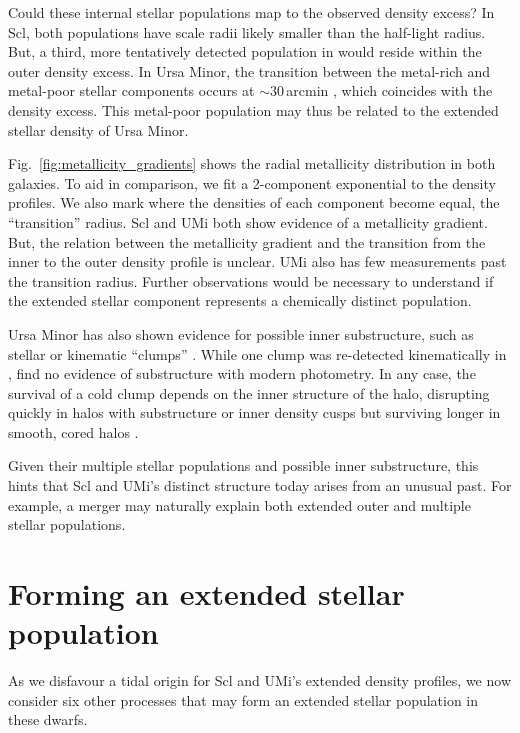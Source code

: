 Could these internal stellar populations map to the observed density
excess? In Scl, both populations have scale radii likely smaller than
the half-light radius. But, a third, more tentatively detected
population in \citet{arroyo-polonio+2024} would reside within the outer
density excess. In Ursa Minor, the transition between the metal-rich and
metal-poor stellar components occurs at \(\sim 30\,\)arcmin
\citep{pace+2020}, which coincides with the density excess. This
metal-poor population may thus be related to the extended stellar
density of Ursa Minor.

Fig.~\ref{fig:metallicity_gradients} shows the radial metallicity
distribution in both galaxies. To aid in comparison, we fit a
2-component exponential to the density profiles. We also mark where the
densities of each component become equal, the ``transition'' radius. Scl
and UMi both show evidence of a metallicity gradient. But, the relation
between the metallicity gradient and the transition from the inner to
the outer density profile is unclear. UMi also has few measurements past
the transition radius. Further observations would be necessary to
understand if the extended stellar component represents a chemically
distinct population.

Ursa Minor has also shown evidence for possible inner substructure, such
as stellar or kinematic ``clumps''
\citep[e.g.,][]{olszewski+aaronson1985, demers+1995, kleyna+1998, battinelli+demers1999, bellazzini+2002}.
While one clump was re-detected kinematically in \citet{pace+2014},
\citet{munoz+2018} find no evidence of substructure with modern
photometry. In any case, the survival of a cold clump depends on the
inner structure of the halo, disrupting quickly in halos with
substructure or inner density cusps but surviving longer in smooth,
cored halos \citep{kleyna+2003, lora+2012}.

Given their multiple stellar populations and possible inner
substructure, this hints that Scl and UMi's distinct structure today
arises from an unusual past. For example, a merger may naturally explain
both extended outer and multiple stellar populations.

\section{Forming an extended stellar
population}\label{sec:stellar_halos}

As we disfavour a tidal origin for Scl and UMi's extended density
profiles, we now consider six other processes that may form an extended
stellar population in these dwarfs.

